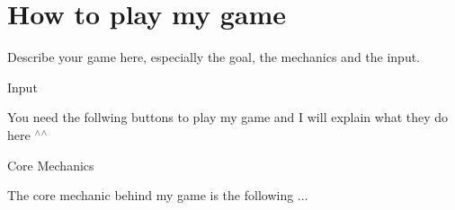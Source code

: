 \chapter{How to play my game }
\hypertarget{md__c_1_2_users_2julia_2_git-projects_205-gl3-kalb_2code_2docs_2wiki_2game}{}\label{md__c_1_2_users_2julia_2_git-projects_205-gl3-kalb_2code_2docs_2wiki_2game}
\label{md__c_1_2_users_2julia_2_git-projects_205-gl3-kalb_2code_2docs_2wiki_2game_autotoc_md4}%
%


Describe your game here, especially the goal, the mechanics and the input.


\begin{DoxyEnumerate}
\item Input
\end{DoxyEnumerate}
\begin{DoxyItemize}
\item You need the follwing buttons to play my game and I will explain what they do here \texorpdfstring{$^\wedge$}{\string^}\texorpdfstring{$^\wedge$}{\string^}
\end{DoxyItemize}
\begin{DoxyEnumerate}
\item Core Mechanics
\end{DoxyEnumerate}
\begin{DoxyItemize}
\item The core mechanic behind my game is the following ... 
\end{DoxyItemize}